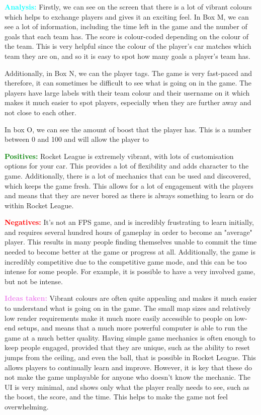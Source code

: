 \textcolor{cyan}{\textbf{Analysis:}} Firstly, we can see on the screen that there is a lot of vibrant colours which helps to exchange players and gives it an exciting feel. In Box M, we can see a lot of information, including the time left in the game and the number of goals that each team has. The score is colour-coded depending on the colour of the team. This is very helpful since the colour of the player's car matches which team they are on, and so it is easy to spot how many goals a player's team has.

\vs
Additionally, in Box N, we can the player tags. The game is very fast-paced and therefore, it can sometimes be difficult to see what is going on in the game. The players have large labels with their team colour and their username on it which makes it much easier to spot players, especially when they are further away and not close to each other.

\vs
In box O, we can see the amount of boost that the player has. This is a number between 0 and 100 and will allow the player to 


\textcolor{green}{\textbf{Positives:}} Rocket League is extremely vibrant, with lots of customisation options for your car. This provides a lot of flexibility and adds character to the game. Additionally, there is a lot of mechanics that can be used and discovered, which keeps the game fresh. This allows for a lot of engagement with the players and means that they are never bored as there is always something to learn or do within Rocket League.

\vs

\textcolor{red}{\textbf{Negatives:}} It's not an FPS game, and is incredibly frustrating to learn initially, and requires several hundred hours of gameplay in order to become an "average" player. This results in many people finding themselves unable to commit the time needed to become better at the game or progress at all. Additionally, the game is incredibly competitive due to the competitive game mode, and this can be too intense for some people. For example, it is possible to have a very involved game, but not be intense.
\vs

\textcolor{violet}{\textbf{Ideas taken:}} Vibrant colours are often quite appealing and makes it much easier to understand what is going on in the game. The small map sizes and relatively low render requirements make it much more easily accessible to people on low-end setups, and means that a much more powerful computer is able to run the game at a much better quality. Having simple game mechanics is often enough to keep people engaged, provided that they are unique, such as the ability to reset jumps from the ceiling, and even the ball, that is possible in Rocket League. This allows players to continually learn and improve. However, it is key that these do not make the game unplayable for anyone who doesn't know the mechanic. The UI is very minimal, and shows only what the player really needs to see, such as the boost, the score, and the time. This helps to make the game not feel overwhelming.


